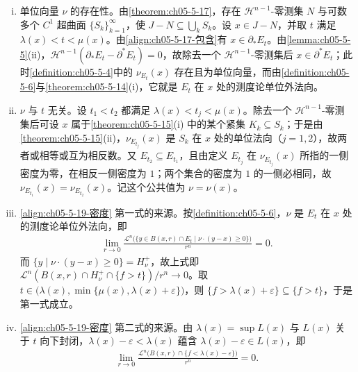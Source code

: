 \documentclass[../../main.tex]{subfiles}%
\begin{document}
\begin{remark}\label{remark:ch05-thm-5-19-论证一}
\begin{enumerate}[(i)]
\item 单位向量 $\nu$ 的存在性。由\cref{theorem:ch05-5-17}，存在 $\mathcal{H}^{n-1}$-零测集 $N$ 与可数多个 $C^1$ 超曲面 $\{S_k\}_{k=1}^{\infty}$，使 $J-N\subseteq\bigcup_{k}S_k$。设 $x\in J-N$，并取 $t$ 满足 $\lambda(x)<t<\mu(x)$。由\eqref{align:ch05-5-17-包含}有 $x\in\partial_*E_t$。由\cref{lemma:ch05-5-5}(ii)，$\mathcal{H}^{n-1}(\partial_*E_t-\partial^*E_t)=0$，故除去一个 $\mathcal{H}^{n-1}$-零测集后 $x\in\partial^*E_t$；此时\cref{definition:ch05-5-4}中的 $\nu_{E_t}(x)$ 存在且为单位向量，而由\cref{definition:ch05-5-6}与\cref{theorem:ch05-5-14}(i)，它就是 $E_t$ 在 $x$ 处的测度论单位外法向。%
\item $\nu$ 与 $t$ 无关。设 $t_1<t_2$ 都满足 $\lambda(x)<t_j<\mu(x)$。除去一个 $\mathcal{H}^{n-1}$-零测集后可设 $x$ 属于\cref{theorem:ch05-5-15}(i) 中的某个紧集 $K_k\subseteq S_k$；于是由\cref{theorem:ch05-5-15}(ii)，$\nu_{E_{t_j}}(x)$ 是 $S_k$ 在 $x$ 处的单位法向（$j=1,2$），故两者或相等或互为相反数。又 $E_{t_2}\subseteq E_{t_1}$，且由定义 $E_{t_j}$ 在 $\nu_{E_{t_j}}(x)$ 所指的一侧密度为零，在相反一侧密度为 $1$；两个集合的密度为 $1$ 的一侧必相同，故 $\nu_{E_{t_1}}(x)=\nu_{E_{t_2}}(x)$。记这个公共值为 $\nu=\nu(x)$。%
\item \eqref{align:ch05-5-19-密度} 第一式的来源。按\cref{definition:ch05-5-6}，$\nu$ 是 $E_t$ 在 $x$ 处的测度论单位外法向，即 %
\begin{align*}
\lim_{r\to0}\frac{\mathcal{L}^n\bigl(\{y\in B(x,r)\cap E_t\mid\nu\cdot(y-x)\geqslant0\}\bigr)}{r^n}=0 .
\end{align*}
而 $\{y\mid\nu\cdot(y-x)\geqslant0\}=H_\nu^+$，故上式即 $\mathcal{L}^n(B(x,r)\cap H_\nu^+\cap\{f>t\})/r^n\to0$。取 $t\in\bigl(\lambda(x),\min\{\mu(x),\lambda(x)+\varepsilon\}\bigr)$，则 $\{f>\lambda(x)+\varepsilon\}\subseteq\{f>t\}$，于是第一式成立。
\item \eqref{align:ch05-5-19-密度} 第二式的来源。由 $\lambda(x)=\sup L(x)$ 与 $L(x)$ 关于 $t$ 向下封闭，$\lambda(x)-\varepsilon<\lambda(x)$ 蕴含 $\lambda(x)-\varepsilon\in L(x)$，即
\begin{align*}
\lim_{r\to0}\frac{\mathcal{L}^n\bigl(B(x,r)\cap\{f<\lambda(x)-\varepsilon\}\bigr)}{r^n}=0 .

\end{align*}
\end{enumerate}
\end{remark}
\end{document}

